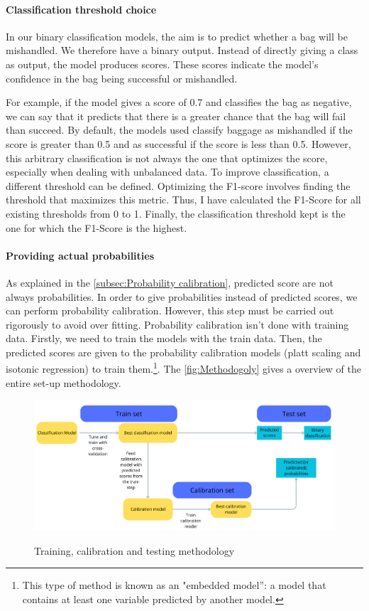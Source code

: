 \documentclass[12pt]{article}
\begin{document}
\paragraph{Classification threshold choice} 
In our binary classification models, the aim is to predict whether a bag will be mishandled. We therefore have a binary output. Instead of directly giving a class as output, the model produces scores. These scores indicate the model's confidence in the bag being successful or mishandled.
 
For example, if the model gives a score of 0.7 and classifies the bag as negative, we can say that it predicts that there is a greater chance that the bag will fail than succeed. By default, the models used classify baggage as mishandled if the score is greater than 0.5 and as successful if the score is less than 0.5. However, this arbitrary classification is not always the one that optimizes the score, especially when dealing with unbalanced data. 
To improve classification, a different threshold can be defined.
Optimizing the F1-score involves finding the threshold that maximizes this metric. 
Thus, I have calculated the F1-Score for all existing thresholds from 0 to 1. Finally, the classification threshold kept is the one for which the F1-Score is the highest.


\paragraph{Providing actual probabilities} As explained in the \autoref{subsec:Probability calibration}, predicted score are not always probabilities. In order to give probabilities instead of predicted scores, we can perform probability calibration. However, this step must be carried out rigorously to avoid over fitting. \hfill \break
Probability calibration isn't done with training data. Firstly, we need to train the models with the train data. Then, the predicted scores are given to the probability calibration models (platt scaling and isotonic regression) to train them.\footnote{This type of method is known as an "embedded model”: a model that contains at least one variable predicted by another model.}. The \autoref{fig:Methodogoly} gives a overview of the entire set-up methodology.

\begin{figure}[h]
    \centering
    \includegraphics[width=1\textwidth]{Methodology.png}\\
    \caption{Training, calibration and testing methodology}
    \label{fig:Methodogoly}
\end{figure}
\FloatBarrier
\end{document}
